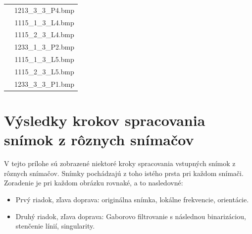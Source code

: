 \begin{table}
\begin{tabular}{ | c | c | }
                          & 1213\_3\_3\_P4.bmp \\
                          & 1115\_1\_3\_L4.bmp \\
                          & 1115\_2\_3\_L4.bmp \\
                          & 1233\_1\_3\_P2.bmp \\
                          & 1115\_1\_3\_L5.bmp \\
                          & 1115\_2\_3\_L5.bmp \\
                          & 1233\_3\_3\_P1.bmp  \\
      \hline
    \end{tabular}
  \end{table}

\chapter{Výsledky krokov spracovania snímok z rôznych snímačov} \label{priloha:vysledky_spracovania}
  V tejto prílohe sú zobrazené niektoré kroky spracovania vstupných snímok z rôznych snímačov. Snímky pochádzajú z toho istého prsta pri každom snímači.
  Zoradenie je pri každom obrázku rovnaké, a to nasledovné:
  \begin{itemize}
    \item Prvý riadok, zľava doprava: originálna snímka, lokálne frekvencie, orientácie.
    \item Druhý riadok, zľava doprava: Gaborovo filtrovanie s následnou binarizáciou, stenčenie línií, singularity.
  \end{itemize}

